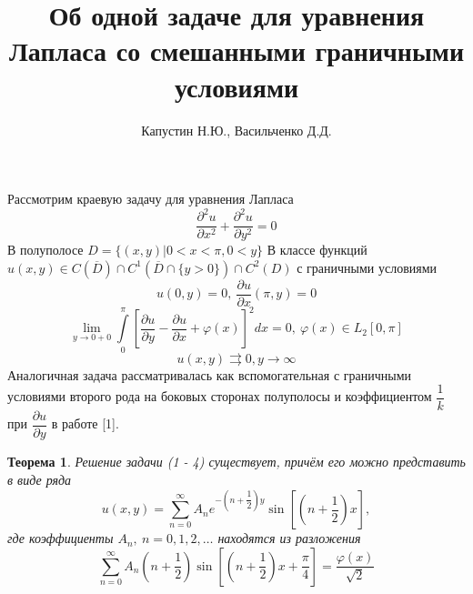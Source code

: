 \documentclass[a4paper, 9pt]{article}
\title{Об одной задаче для уравнения Лапласа со смешанными граничными условиями}
\author{Капустин Н.Ю., Васильченко Д.Д.}
\newtheorem{theorem}{Теорема}
\begin{document}
	\maketitle
	Рассмотрим краевую задачу для уравнения Лапласа
	\begin{equation}
		\dfrac{\partial^2 u}{\partial x^2} +\dfrac{\partial^2 u}{\partial y^2} = 0
	\end{equation}
	В полуполосе $D = \{(x,y) \vert 0 < x < \pi, 0 < y\}$\newline
	В классе функций $u(x,y) \in C(\overline{D}) \cap C^1(\overline{D} \cap \{y > 0\}) \cap C^2 (D)$ \newline
	с граничными условиями
	\begin{equation}
		u(0, y) = 0, \ \dfrac{\partial u}{\partial x} (\pi, y) = 0
	\end{equation}
	\begin{equation}
		\lim\limits_{y \to 0 + 0} \int\limits_0^\pi \left[\dfrac{\partial u}{\partial y} - \dfrac{\partial u}{\partial x} + \varphi(x) \right]^2 dx = 0, \ \varphi(x) \in L_2[0,\pi]
	\end{equation}
	\begin{equation}
		u(x,y) \rightrightarrows 0, y \to \infty
	\end{equation}
	Аналогичная задача рассматривалась как вспомогательная с граничными условиями второго рода на боковых сторонах полуполосы и коэффициентом $\dfrac{1}{k}$ при $\dfrac{\partial u}{\partial y}$ в работе [1].
	
	\begin{theorem}
		Решение задачи (1 - 4) существует, причём его можно представить в виде ряда
		\begin{equation}
			u(x,y) = \sum\limits_{n=0}^{\infty} A_n e^{-\left(n + \dfrac12\right)y} \sin{\left[\left(n + \dfrac12\right)x\right]},
		\end{equation}
		где коэффициенты $A_n, \ n =0,1,2, \dots$ находятся из разложения
		\begin{equation}
			\sum\limits_{n=0}^{\infty} A_n \left(n + \dfrac12 \right) \sin{\left[\left(n +\dfrac12\right)x + \dfrac\pi4\right]} = \dfrac{\varphi(x)}{\sqrt2}
		\end{equation}
	\end{theorem}
	
\end{document}
